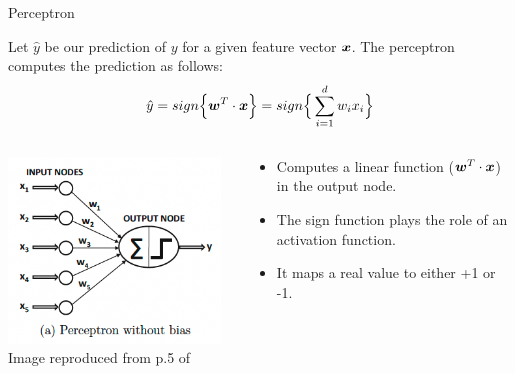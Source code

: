 \begin{frame}[t]{Perceptron}

    Let $\hat{y}$ be our prediction of $y$ for a given feature vector $\boldsymbol{x}$.
    The \gls{perceptron} computes the prediction as follows:
    \begin{equation}
        \hat{y} = sign\Big\{ \boldsymbol{w}^T \cdot \boldsymbol{x} \Big\} = sign\Big\{ \sum_{i=1}^{d} w_i x_i \Big\}
        \label{eq:perceptron_prediction_wo_bias}
    \end{equation}        

    \vspace{-1.0cm}

    \begin{columns}
        \begin{column}{0.50\textwidth}
         \begin{center}
          \includegraphics[width=0.95\textwidth]{./images/perceptron/perceptron_without_bias.png}\\
          {\scriptsize \color{col:attribution} 
          Image reproduced from p.5 of \cite{Aggarwal:2018SpringerDL}}\\
         \end{center}
        \end{column}
        \begin{column}{0.50\textwidth}
            \begin{itemize}
                \small
                \item Computes a linear function 
                ($\boldsymbol{w}^T \cdot \boldsymbol{x}$) in the output node.
                \item The sign function plays the role of
                an \gls{activation function}.
                \item It maps a real value to either +1 or -1.
            \end{itemize}        
        \end{column}
    \end{columns}
      
\end{frame}

